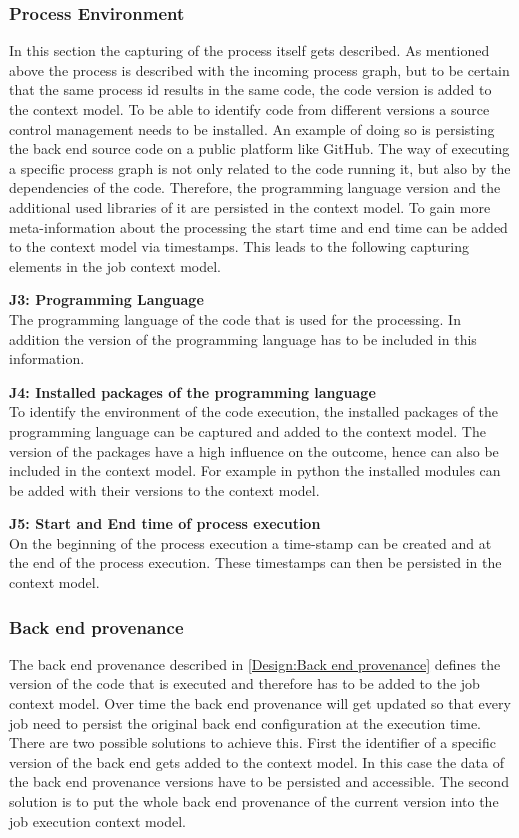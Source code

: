 \documentclass[draft,final]{vutinfth} %
\begin{document}
\subsubsection{Process Environment}\label{Job:Process Data}
In this section the capturing of the process itself gets described. As mentioned above the process is described with the incoming process graph, but to be certain that the same process id results in the same code, the code version is added to the context model. To be able to identify code from different versions a source control management needs to be installed. An example of doing so is persisting the back end source code on a public platform like GitHub. 
The way of executing a specific process graph is not only related to the code running it, but also by the dependencies of the code. Therefore, the programming language version and the additional used libraries of it are persisted in the context model.  To gain more meta-information about the processing the start time and end time can be added to the context model via timestamps. This leads to the following capturing elements in the job context model.

\textbf{J3: Programming Language}\\
The programming language of the code that is used for the processing. In addition the version of the programming language has to be included in this information.

\textbf{J4: Installed packages of the programming language}\\
To identify the environment of the code execution, the installed packages of the programming language can be captured and added to the context model. The version of the packages have a high influence on the outcome, hence can also be included in the context model. For example in python the installed modules can be added with their versions to the context model.

\textbf{J5: Start and End time of process execution}\\
On the beginning of the process execution a time-stamp can be created and at the end of the process execution. These timestamps can then be persisted in the context model.

\subsubsection{Back end provenance}\label{Job:Back end provenance}
The back end provenance described in \ref{Design:Back end provenance} defines the version of the code that is executed and therefore has to be added to the job context model. Over time the back end provenance will get updated so that every job need to persist the original back end configuration at the execution time. There are two possible solutions to achieve this. First the identifier of a specific version of the back end gets added to the context model. In this case the data of the back end provenance versions have to be persisted and accessible. The second solution is to put the whole back end provenance of the current version into the job execution context model.
\end{document}
